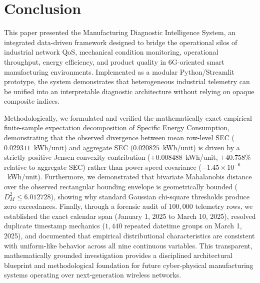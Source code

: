 \documentclass[journal]{IEEEtran}
\begin{document}
\enlargethispage{3\baselineskip}
\section{Conclusion}
\label{sec:conclusion}
This paper presented the Manufacturing Diagnostic Intelligence System, an integrated data-driven framework designed to bridge the operational silos of industrial network QoS, mechanical condition monitoring, operational throughput, energy efficiency, and product quality in 6G-oriented smart manufacturing environments. Implemented as a modular Python/Streamlit prototype, the system demonstrates that heterogeneous industrial telemetry can be unified into an interpretable diagnostic architecture without relying on opaque composite indices. 

Methodologically, we formulated and verified the mathematically exact empirical finite-sample expectation decomposition of Specific Energy Consumption, demonstrating that the observed divergence between mean row-level SEC ($0.029311$~kWh/unit) and aggregate SEC ($0.020825$~kWh/unit) is driven by a strictly positive Jensen convexity contribution ($+0.008488$~kWh/unit, $+40.758\%$ relative to aggregate SEC) rather than power-speed covariance ($-1.45 \times 10^{-6}$~kWh/unit). Furthermore, we demonstrated that bivariate Mahalanobis distance over the observed rectangular bounding envelope is geometrically bounded ($D_M^2 \le 6.012728$), showing why standard Gaussian chi-square thresholds produce zero exceedances. Finally, through a forensic audit of $100{,}000$ telemetry rows, we established the exact calendar span (January 1, 2025 to March 10, 2025), resolved duplicate timestamp mechanics ($1{,}440$ repeated datetime groups on March 1, 2025), and documented that empirical distributional characteristics are consistent with uniform-like behavior across all nine continuous variables. This transparent, mathematically grounded investigation provides a disciplined architectural blueprint and methodological foundation for future cyber-physical manufacturing systems operating over next-generation wireless networks.

\IEEEtriggercmd{\enlargethispage{3\baselineskip}}

\let\oldthebibliography\thebibliography
\renewcommand{\thebibliography}[1]{%
  \oldthebibliography{#1}%
  \fontsize{7.8pt}{9.0pt}\selectfont
  \setlength{\itemsep}{0.0pt plus 0.2pt}%
  \setlength{\parskip}{0.0pt}%
  \setlength{\parsep}{0.0pt}%
}



\end{document}
